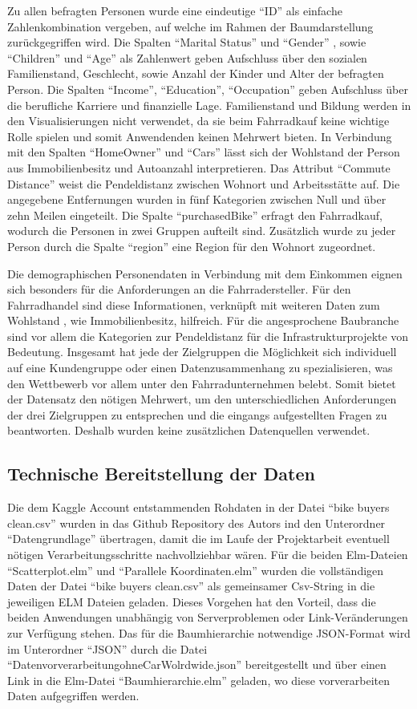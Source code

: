 \documentclass[usegeometry=true]{scrartcl}
\begin{document}
Zu allen befragten Personen wurde eine eindeutige "`ID"' als einfache Zahlenkombination vergeben, auf welche im Rahmen der Baumdarstellung zurückgegriffen wird. 
 Die Spalten "`Marital Status"' und "`Gender"' , sowie  "`Children"' und "`Age"' als Zahlenwert geben Aufschluss über den sozialen  Familienstand, Geschlecht, sowie Anzahl der Kinder und Alter der befragten Person. Die Spalten "`Income"', "`Education"', "`Occupation"' geben Aufschluss über die berufliche Karriere und finanzielle Lage. Familienstand und Bildung werden in den Visualisierungen nicht verwendet, da sie beim Fahrradkauf keine wichtige Rolle spielen und somit Anwendenden keinen Mehrwert bieten. In Verbindung mit den Spalten "`HomeOwner"' und "`Cars"' lässt sich der Wohlstand der Person aus Immobilienbesitz und Autoanzahl interpretieren. Das Attribut "`Commute Distance"' weist die Pendeldistanz zwischen Wohnort und Arbeitsstätte auf. Die angegebene Entfernungen wurden in fünf Kategorien zwischen Null und über zehn Meilen eingeteilt. Die Spalte "`purchasedBike"' erfragt den Fahrradkauf, wodurch die Personen in zwei Gruppen aufteilt sind. Zusätzlich wurde zu jeder Person durch die Spalte "`region"' eine Region für den Wohnort zugeordnet.

Die demographischen Personendaten in Verbindung mit dem Einkommen eignen sich besonders für die Anforderungen an die Fahrradersteller. Für den Fahrradhandel sind diese Informationen, verknüpft mit weiteren Daten zum Wohlstand , wie Immobilienbesitz, hilfreich. Für die angesprochene Baubranche sind vor allem die Kategorien zur Pendeldistanz für die Infrastrukturprojekte von Bedeutung. 
Insgesamt hat jede der Zielgruppen die Möglichkeit sich individuell auf eine Kundengruppe oder einen Datenzusammenhang zu spezialisieren, was den Wettbewerb vor allem unter den Fahrradunternehmen belebt. Somit bietet der Datensatz den nötigen Mehrwert, um den unterschiedlichen Anforderungen der drei Zielgruppen zu entsprechen und die eingangs aufgestellten Fragen zu beantworten. Deshalb wurden keine zusätzlichen Datenquellen verwendet. 

\subsection{Technische Bereitstellung der Daten}


Die dem Kaggle Account \cite{Dedhia.22.09.2020} entstammenden Rohdaten in der Datei "`bike buyers clean.csv"' wurden in das Github Repository des Autors ind den Unterordner "`Datengrundlage"' übertragen, damit die im Laufe der Projektarbeit eventuell nötigen Verarbeitungsschritte nachvollziehbar wären. Für die beiden Elm-Dateien "`Scatterplot.elm"' und "`Parallele Koordinaten.elm"' wurden die vollständigen Daten der Datei "`bike buyers clean.csv"' als gemeinsamer Csv-String in die jeweiligen ELM Dateien geladen. Dieses Vorgehen hat den Vorteil, dass die beiden Anwendungen unabhängig von Serverproblemen oder Link-Veränderungen zur Verfügung stehen. Das für die Baumhierarchie notwendige JSON-Format wird im Unterordner "`JSON"' durch die Datei "`DatenvorverarbeitungohneCarWolrdwide.json"' bereitgestellt und über einen Link in die  Elm-Datei "`Baumhierarchie.elm"' geladen, wo diese vorverarbeiten Daten aufgegriffen werden. 
\end{document}

